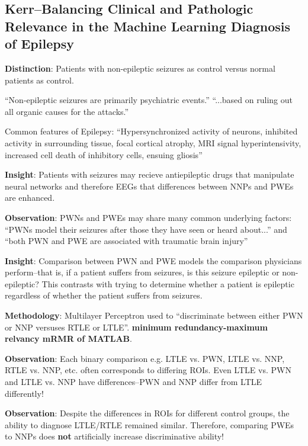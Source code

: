 \documentclass{article}
\begin{document}
    \subsection{Kerr--Balancing Clinical and Pathologic Relevance in the Machine 
Learning
    Diagnosis of Epilepsy}
        \textbf{Distinction}: Patients with non-epileptic seizures as control 
versus
        normal patients as control.

        ``Non-epileptic seizures are primarily psychiatric events.'' ``...based 
on
        ruling out all organic causes for the attacks.''


        Common features of Epilepsy: ``Hypersynchronized activity of neurons, 
inhibited
        activity in surrounding tissue, focal cortical atrophy, MRI signal
        hyperintensivity, increased cell death of inhibitory cells, ensuing 
gliosis''

        \textbf{Insight}: Patients with seizures may recieve antiepileptic drugs 
that manipulate
        neural networks and therefore EEGs that differences between NNPs and 
PWEs are
        enhanced.

        \textbf{Observation}: PWNs and PWEs may share many common underlying 
factors: ``PWNs
        model their seizures after those they have seen or heard about...'' and 
``both
        PWN and PWE are associated with traumatic brain injury''

        \textbf{Insight}: Comparison between PWN and PWE models the comparison 
physicians
        perform--that is, if a patient suffers from seizures, is this seizure 
epileptic
        or non-epileptic? This contrasts with trying to determine whether a 
patient is
        epileptic regardless of whether the patient suffers from seizures.

        \textbf{Methodology}: Multilayer Perceptron used to ``discriminate 
between either PWN or
        NNP versuses RTLE or LTLE''. \textbf{minimum redundancy-maximum relvancy 
mRMR of
        MATLAB}.

        \textbf{Observation}: Each binary comparison e.g. LTLE vs. PWN, LTLE vs. 
NNP, RTLE vs.
        NNP, etc. often corresponds to differing ROIs. Even LTLE vs. PWN and 
LTLE vs.
        NNP have differences--PWN and NNP differ from LTLE differently!

        \textbf{Observation}: Despite the differences in ROIs for different 
control
        groups, the ability to diagnose LTLE/RTLE remained similar. Therefore,
        comparing PWEs to NNPs does \textbf{not} artificially increase 
discriminative
        ability!
\end{document}
